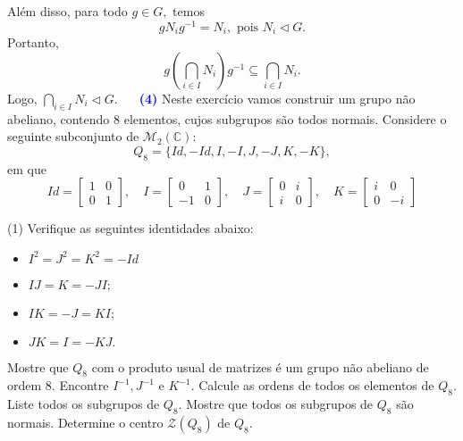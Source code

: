 \documentclass[12pt, a4paper]{article}
\newcommand{\negrito}[1]{\mbox{\boldmath{$#1$}}}
\begin{document}
Além disso, para todo $g \in G,$ temos
\[
gN_ig^{-1} = N_i, \mbox{ pois } N_i \lhd G.
\]
Portanto,
\[
g \left(\bigcap\limits_{i \in I} N_i \right) g^{-1} \subseteq \bigcap\limits_{i \in I} N_i.
\]
Logo, $\bigcap\limits_{i \in I} N_i \lhd G.$
\textcolor{white}{Oi}\newline\newline
\textcolor{blue}{\bf(4)}\label{42} Neste exercício vamos construir um grupo não abeliano, contendo $8$ elementos, cujos subgrupos são todos normais. Considere o seguinte subconjunto de $\mathcal{M}_2(\mathbb{C}):$
\[
Q_8 = \{Id,-Id, I, -I, J, -J, K, -K\},
\]
em que
\[
Id = \left[\begin{array}{cc} 1 & 0 \\ 0 & 1 \end{array}\right], \quad I = \left[\begin{array}{cc} 0 & 1 \\ -1 & 0 \end{array}\right],  \quad J = \left[\begin{array}{cc} 0 & i \\ i & 0 \end{array}\right], \quad K = \left[\begin{array}{cc} i & 0 \\ 0 & -i \end{array}\right] 
\]
\begin{tasks}[counter-format={(tsk[a])},label-width=3.6ex, label-format = {\bfseries}, column-sep = {0pt}](1)
\task[\textcolor{Floresta}{$\negrito{(a)} $}] Verifique as seguintes identidades abaixo:
\begin{itemize}
\item $I^2 = J^2 = K^2 = -Id$
\item $IJ = K = -JI;$
\item $IK = -J = KI;$
\item $JK = I = -KJ.$
\end{itemize}
\task[\textcolor{Floresta}{$\negrito{(b)} $}] Mostre que $Q_8$ com o produto usual de matrizes é um grupo não abeliano de ordem $8.$
\task[\textcolor{Floresta}{$\negrito{(c)} $}] Encontre $I^{-1}, J^{-1}$ e $K^{-1}.$
\task[\textcolor{Floresta}{$\negrito{(d)} $}] Calcule as ordens de todos os elementos de $Q_8.$
\task[\textcolor{Floresta}{$\negrito{(e)} $}] Liste todos os subgrupos de $Q_8.$
\task[\textcolor{Floresta}{$\negrito{(f)} $}] Mostre que todos os subgrupos de $Q_8$ são normais.
\task[\textcolor{Floresta}{$\negrito{(g)} $}] Determine o centro $\mathcal{Z}(Q_8)$ de $Q_8.$
\end{tasks}
\end{document}
